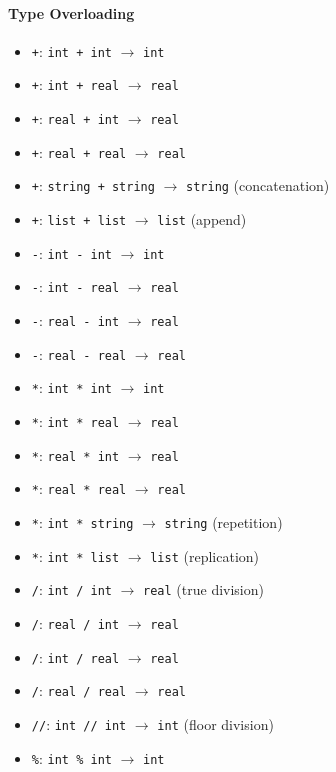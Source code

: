 \documentclass{report}
\begin{document}
\paragraph{Type Overloading}
\begin{itemize}
\item \texttt{+}: \texttt{int + int} $\rightarrow$ \texttt{int}
\item \texttt{+}: \texttt{int + real} $\rightarrow$ \texttt{real}
\item \texttt{+}: \texttt{real + int} $\rightarrow$ \texttt{real}
\item \texttt{+}: \texttt{real + real} $\rightarrow$ \texttt{real}
\item \texttt{+}: \texttt{string + string} $\rightarrow$ \texttt{string} (concatenation)
\item \texttt{+}: \texttt{list + list} $\rightarrow$ \texttt{list} (append)
\item \texttt{-}: \texttt{int - int} $\rightarrow$ \texttt{int}
\item \texttt{-}: \texttt{int - real} $\rightarrow$ \texttt{real}
\item \texttt{-}: \texttt{real - int} $\rightarrow$ \texttt{real}
\item \texttt{-}: \texttt{real - real} $\rightarrow$ \texttt{real}
\item \texttt{*}: \texttt{int * int} $\rightarrow$ \texttt{int}
\item \texttt{*}: \texttt{int * real} $\rightarrow$ \texttt{real}
\item \texttt{*}: \texttt{real * int} $\rightarrow$ \texttt{real}
\item \texttt{*}: \texttt{real * real} $\rightarrow$ \texttt{real}
\item \texttt{*}: \texttt{int * string} $\rightarrow$ \texttt{string} (repetition)
\item \texttt{*}: \texttt{int * list} $\rightarrow$ \texttt{list} (replication)
\item \texttt{/}: \texttt{int / int} $\rightarrow$ \texttt{real} (true division)
\item \texttt{/}: \texttt{real / int} $\rightarrow$ \texttt{real}
\item \texttt{/}: \texttt{int / real} $\rightarrow$ \texttt{real}
\item \texttt{/}: \texttt{real / real} $\rightarrow$ \texttt{real}
\item \texttt{//}: \texttt{int // int} $\rightarrow$ \texttt{int} (floor division)
\item \texttt{\%}: \texttt{int \% int} $\rightarrow$ \texttt{int}

\end{itemize}
\end{document}
